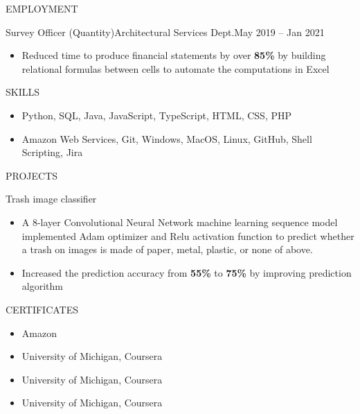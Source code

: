\documentclass[]{resume}
\begin{document}
\begin{cvsection}{EMPLOYMENT}
		\begin{cvsubsection}{Survey Officer (Quantity)}{Architectural Services Dept.}{May 2019 -- Jan 2021}	
			\begin{itemize}
				\item Reduced time to produce financial statements by over \textbf{85\%} by building relational formulas between cells to automate the computations in Excel
			\end{itemize}
		\end{cvsubsection}
	\end{cvsection}

	\begin{cvsection}{SKILLS}
		\begin{cvsubsection}{}{}{}	
			\begin{itemize}
				\item Python, SQL, Java, JavaScript, TypeScript, HTML, CSS, PHP
				\item Amazon Web Services, Git, Windows, MacOS, Linux, GitHub, Shell Scripting, Jira
			\end{itemize}
		\end{cvsubsection}
	\end{cvsection}
	
	\begin{cvsection}{PROJECTS}
		\begin{cvsubsection}{Trash image classifier}{}{}
			\begin{itemize}
			    \item A 8-layer Convolutional Neural Network machine learning sequence model implemented Adam optimizer and Relu activation function to predict whether a trash on images is made of paper, metal, plastic, or none of above. 
			    \item Increased the prediction accuracy from \textbf{55\%} to \textbf{75\%} by improving prediction algorithm
			\end{itemize}
		\end{cvsubsection}
	\end{cvsection}
	
	\begin{cvsection}{CERTIFICATES}
		\begin{cvsubsection}{}{}{}
		    \begin{itemize}
            \item \noindent {} \hfill {Amazon} \hfill {}
            \newline \noindent {} \hfill {} \hfill \llap{}
		        \item \noindent {} \hfill {University of Michigan, Coursera}\hfill {}
		        \item \noindent {} \hfill {University of Michigan, Coursera}\hfill {}
		        \item \noindent {} \hfill {University of Michigan, Coursera}\hfill {}
		    \end{itemize}
		\end{cvsubsection}
	\end{cvsection}
\end{document}
